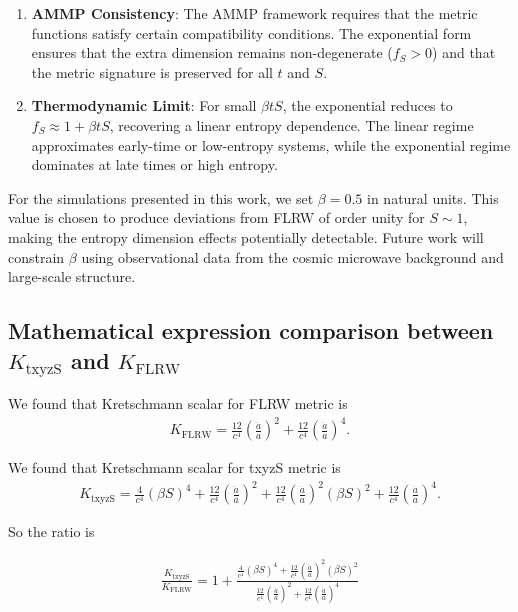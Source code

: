 \documentclass[11pt,a4paper]{article}
\begin{document}
\begin{enumerate}
    \item \textbf{AMMP Consistency}: The AMMP framework requires that the 
          metric functions satisfy certain compatibility conditions. The 
          exponential form ensures that the extra dimension remains 
          non-degenerate ($f_S > 0$) and that the metric signature is 
          preserved for all $t$ and $S$.

    \item \textbf{Thermodynamic Limit}: For small $\beta t S$, the exponential 
          reduces to $f_S \approx 1 + \beta t S$, recovering a linear entropy 
          dependence. The linear regime approximates early-time or low-entropy 
          systems, while the exponential regime dominates at late times or 
          high entropy.
\end{enumerate}

For the simulations presented in this work, we set $\beta = 0.5$ in natural 
units. This value is chosen to produce deviations from FLRW of order unity 
for $S \sim 1$, making the entropy dimension effects potentially detectable. 
Future work will constrain $\beta$ using observational data from the cosmic 
microwave background and large-scale structure.

\subsection{Mathematical expression comparison between $K_{\text{txyzS}}$ and $K_{\text{FLRW}}$}\label{sec:kretschmann_comparison}
We found that Kretschmann scalar for FLRW metric is 
          \begin{align}
          K_{\text{FLRW}} = \frac{12}{c^4}\left(\frac{\ddot{a}}{a}\right)^2 
          + \frac{12}{c^4}\left(\frac{\dot{a}}{a}\right)^4.
          \end{align}

We found that Kretschmann scalar for txyzS metric is 
          \begin{align}
          K_{\text{txyzS}} = \frac{4}{c^4}(\beta S)^4 
          + \frac{12}{c^4}\left(\frac{\ddot{a}}{a}\right)^2 
          + \frac{12}{c^4}\left(\frac{\dot{a}}{a}\right)^2 (\beta S)^2 
          + \frac{12}{c^4}\left(\frac{\dot{a}}{a}\right)^4.
          \end{align}
          
So the ratio is           

          \begin{align}
          \frac{ K_{\text{txyzS}} }{ K_{\text{FLRW}} } 
          = 
          1 + 
          \frac{
          \frac{4}{c^4}(\beta S)^4 
          + 
          \frac{12}{c^4}\left(\frac{\dot{a}}{a}\right)^2 (\beta S)^2 
          }{
          \frac{12}{c^4}\left(\frac{\ddot{a}}{a}\right)^2 
          + \frac{12}{c^4}\left(\frac{\dot{a}}{a}\right)^4
          }
          \end{align}
\end{document}
